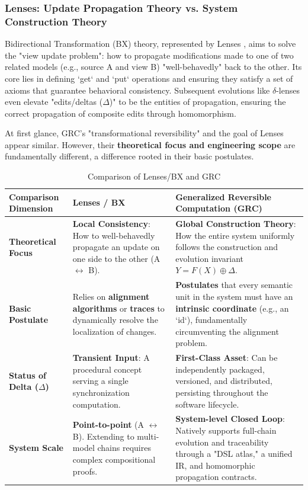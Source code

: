 \documentclass[11pt]{article}
\begin{document}
\subsubsection{Lenses: Update Propagation Theory vs. System Construction Theory}
\label{sec:lenses}

Bidirectional Transformation (BX) theory, represented by Lenses \cite{foster2007}, aims to solve the "view update problem": how to propagate modifications made to one of two related models (e.g., source A and view B) "well-behavedly" back to the other. Its core lies in defining `get` and `put` operations and ensuring they satisfy a set of axioms that guarantee behavioral consistency. Subsequent evolutions like $\delta$-lenses even elevate "edits/deltas ($\Delta$)" to be the entities of propagation, ensuring the correct propagation of composite edits through homomorphism.

At first glance, GRC's "transformational reversibility" and the goal of Lenses appear similar. However, their \textbf{theoretical focus and engineering scope} are fundamentally different, a difference rooted in their basic postulates.

\begin{table}[htbp]
\centering
\caption{Comparison of Lenses/BX and GRC}
\begin{tabularx}{\textwidth}{@{} >{\bfseries}l X X @{}}
\toprule
Comparison Dimension & \textbf{Lenses / BX} & \textbf{Generalized Reversible Computation (GRC)} \\
\midrule
\textbf{Theoretical Focus} & \textbf{Local Consistency}: How to well-behavedly propagate an update on one side to the other (A $\leftrightarrow$ B). & \textbf{Global Construction Theory}: How the entire system uniformly follows the construction and evolution invariant $Y = F(X) \oplus \Delta$. \\
\addlinespace
\textbf{Basic Postulate} & Relies on \textbf{alignment algorithms} or \textbf{traces} to dynamically resolve the localization of changes. & \textbf{Postulates} that every semantic unit in the system must have an \textbf{intrinsic coordinate} (e.g., an `id`), fundamentally circumventing the alignment problem. \\
\addlinespace
\textbf{Status of Delta ($\Delta$)} & \textbf{Transient Input}: A procedural concept serving a single synchronization computation. & \textbf{First-Class Asset}: Can be independently packaged, versioned, and distributed, persisting throughout the software lifecycle. \\
\addlinespace
\textbf{System Scale} & \textbf{Point-to-point} (A $\leftrightarrow$ B). Extending to multi-model chains requires complex compositional proofs. & \textbf{System-level Closed Loop}: Natively supports full-chain evolution and traceability through a "DSL atlas," a unified IR, and homomorphic propagation contracts. \\
\bottomrule
\end{tabularx}
\end{table}
\end{document}
